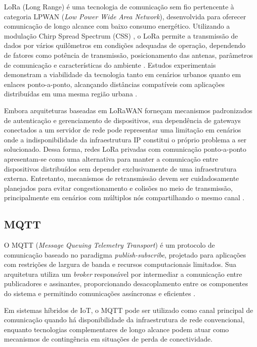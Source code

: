 \documentclass[
article,            %
11pt,               %
twoside,            %
a4paper,            %
section=TITLE,      %
onecolumn,          %
english,            %
brazil,             %
sumario=tradicional
]{abntex2}
\begin{document}
LoRa (Long Range) é uma tecnologia de comunicação sem fio pertencente à categoria LPWAN (\textit{Low Power Wide Area Network}), desenvolvida para oferecer comunicação de longo alcance com baixo consumo energético. Utilizando a modulação Chirp Spread Spectrum (CSS) \cite{Semtech2015}, o LoRa permite a transmissão de dados por vários quilômetros em condições adequadas de operação, dependendo de fatores como potência de transmissão, posicionamento das antenas, parâmetros de comunicação e características do ambiente \cite{Petajajarvi2015}. Estudos experimentais demonstram a viabilidade da tecnologia tanto em cenários urbanos quanto em enlaces ponto-a-ponto, alcançando distâncias compatíveis com aplicações distribuídas em uma mesma região urbana \cite{Callebaut2019}.

Embora arquiteturas baseadas em LoRaWAN forneçam mecanismos padronizados de autenticação e gerenciamento de dispositivos, sua dependência de gateways conectados a um servidor de rede pode representar uma limitação em cenários onde a indisponibilidade da infraestrutura IP constitui o próprio problema a ser solucionado. Dessa forma, redes LoRa privadas com comunicação ponto-a-ponto apresentam-se como uma alternativa para manter a comunicação entre dispositivos distribuídos sem depender exclusivamente de uma infraestrutura externa. Entretanto, mecanismos de retransmissão devem ser cuidadosamente planejados para evitar congestionamento e colisões no meio de transmissão, principalmente em cenários com múltiplos nós compartilhando o mesmo canal \cite{Bor2016}.

\subsection{MQTT}

O MQTT (\textit{Message Queuing Telemetry Transport}) é um protocolo de comunicação baseado no paradigma \textit{publish-subscribe}, projetado para aplicações com restrições de largura de banda e recursos computacionais limitados. Sua arquitetura utiliza um \textit{broker} responsável por intermediar a comunicação entre publicadores e assinantes, proporcionando desacoplamento entre os componentes do sistema e permitindo comunicações assíncronas e eficientes \cite{Bhawiyuga2019}.

Em sistemas híbridos de IoT, o MQTT pode ser utilizado como canal principal de comunicação quando há disponibilidade da infraestrutura de rede convencional, enquanto tecnologias complementares de longo alcance podem atuar como mecanismos de contingência em situações de perda de conectividade.
\end{document}
